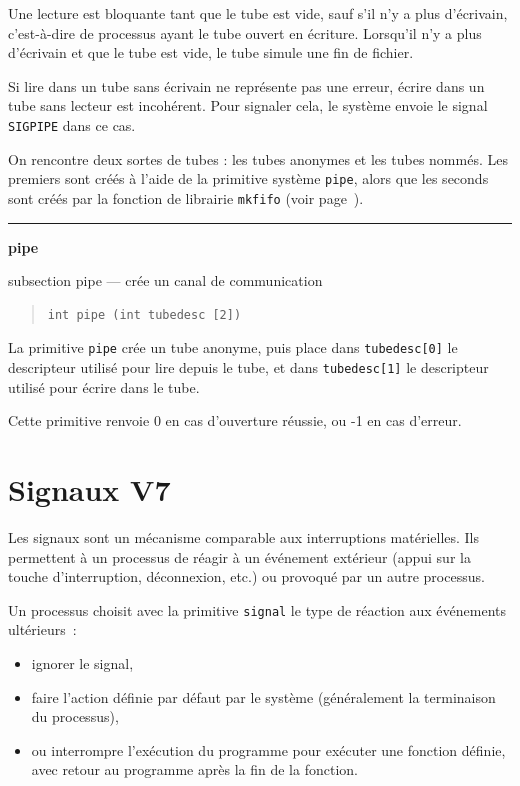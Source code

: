 \documentclass [twoside] {report}
\newcommand {\primitive} [1]
    {
	\phantomsection
	{\large \textbf {#1}}
	\addcontentsline {toc} {subsection} {#1}
    }
\newcommand {\separation}
    {
	\vspace {5mm}
	\nopagebreak
	\hrule
    }
\begin{document}
Une lecture est bloquante tant que le tube est vide, sauf s'il n'y a
plus d'écrivain, c'est-à-dire de processus ayant le tube ouvert en
écriture. Lorsqu'il n'y a plus d'écrivain et que le tube est vide,
le tube simule une fin de fichier.

Si lire dans un tube sans écrivain ne représente pas une erreur,
écrire dans un tube sans lecteur est incohérent. Pour signaler
cela, le système envoie le signal \texttt {SIGPIPE} dans ce cas.

On rencontre deux sortes de tubes : les tubes anonymes et
les tubes nommés. Les premiers sont créés à l'aide de la
primitive système \texttt {pipe}, alors que les seconds sont créés par
la fonction de librairie \texttt {mkfifo} (voir page~\pageref {mkfifo}).


\separation
\primitive {pipe} --- crée un canal de communication

\begin {quote}
\begin {verbatim}
int pipe (int tubedesc [2])
\end{verbatim}
\end {quote}

La primitive \texttt {pipe} crée un tube anonyme,
puis place dans \texttt {tubedesc[0]}
le descripteur utilisé pour lire depuis le tube, et dans
\texttt {tubedesc[1]} le descripteur utilisé pour écrire dans le tube.

Cette primitive renvoie 0 en cas d'ouverture
réussie, ou -1 en cas d'erreur.






\section {Signaux V7}


Les signaux sont un mécanisme comparable aux interruptions
matérielles. Ils permettent à un processus de réagir à un
événement extérieur (appui sur la touche d'interruption,
déconnexion, etc.) ou provoqué par un autre processus.

Un processus choisit avec la primitive \texttt {signal}
le type de réaction aux événements ultérieurs~:

\begin {itemize}
    \item ignorer le signal,
    \item faire l'action définie par défaut par le
	système (généralement la terminaison du processus),
    \item ou interrompre l'exécution du programme pour exécuter
	une fonction définie, avec retour au programme après
	la fin de la fonction.
\end {itemize}
\end{document}
